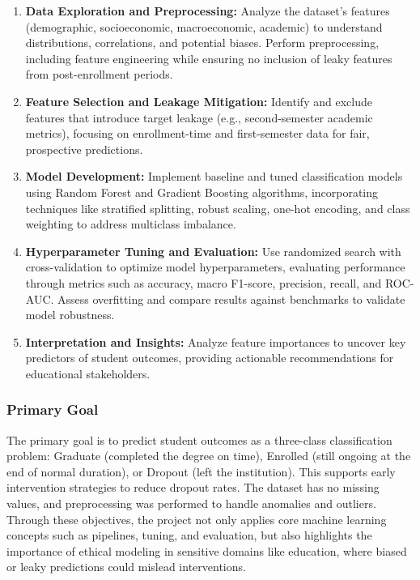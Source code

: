 \documentclass[twoside,final]{hcmut-report}
\begin{document}
\begin{enumerate}
  \item \textbf{Data Exploration and Preprocessing:} Analyze the dataset's features (demographic, socioeconomic, macroeconomic, academic) to understand distributions, correlations, and potential biases. Perform preprocessing, including feature engineering while ensuring no inclusion of leaky features from post-enrollment periods.

  \item \textbf{Feature Selection and Leakage Mitigation:} Identify and exclude features that introduce target leakage (e.g., second-semester academic metrics), focusing on enrollment-time and first-semester data for fair, prospective predictions.

  \item \textbf{Model Development:} Implement baseline and tuned classification models using Random Forest and Gradient Boosting algorithms, incorporating techniques like stratified splitting, robust scaling, one-hot encoding, and class weighting to address multiclass imbalance.

  \item \textbf{Hyperparameter Tuning and Evaluation:} Use randomized search with cross-validation to optimize model hyperparameters, evaluating performance through metrics such as accuracy, macro F1-score, precision, recall, and ROC-AUC. Assess overfitting and compare results against benchmarks to validate model robustness.

  \item \textbf{Interpretation and Insights:} Analyze feature importances to uncover key predictors of student outcomes, providing actionable recommendations for educational stakeholders.
\end{enumerate}

\subsubsection*{Primary Goal}

The primary goal is to predict student outcomes as a three-class classification problem: Graduate (completed the degree on time), Enrolled (still ongoing at the end of normal duration), or Dropout (left the institution). This supports early intervention strategies to reduce dropout rates. The dataset has no missing values, and preprocessing was performed to handle anomalies and outliers. Through these objectives, the project not only applies core machine learning concepts such as pipelines, tuning, and evaluation, but also highlights the importance of ethical modeling in sensitive domains like education, where biased or leaky predictions could mislead interventions.
\end{document}
